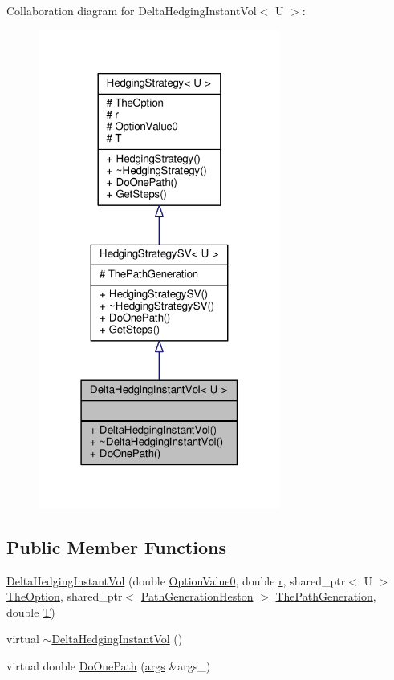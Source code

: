 Collaboration diagram for Delta\+Hedging\+Instant\+Vol$<$ U $>$\+:
\nopagebreak
\begin{figure}[H]
\begin{center}
\leavevmode
\includegraphics[width=226pt]{classDeltaHedgingInstantVol__coll__graph}
\end{center}
\end{figure}
\subsection*{Public Member Functions}
\begin{DoxyCompactItemize}
\item 
\hyperlink{classDeltaHedgingInstantVol_a64229bc4a65fa32959d22bc449ad0520}{Delta\+Hedging\+Instant\+Vol} (double \hyperlink{classHedgingStrategy_ac96528e9f4e5a0d1e5aadcc2ebdcab55}{Option\+Value0}, double \hyperlink{classHedgingStrategy_a313da7bc1911dba2a166d2c7bed5f1d7}{r}, shared\+\_\+ptr$<$ U $>$ \hyperlink{classHedgingStrategy_a65699a183423af9d947bb939ae8e907d}{The\+Option}, shared\+\_\+ptr$<$ \hyperlink{classPathGenerationHeston}{Path\+Generation\+Heston} $>$ \hyperlink{classHedgingStrategySV_aa341650c5b2846606e59e3e6c6225aca}{The\+Path\+Generation}, double \hyperlink{classHedgingStrategy_aedb4069f0709b49482a72b9d9c906a5e}{T})
\item 
virtual \hyperlink{classDeltaHedgingInstantVol_a87a3e73ee61d8dc3d9d04120f9f323a3}{$\sim$\+Delta\+Hedging\+Instant\+Vol} ()
\item 
virtual double \hyperlink{classDeltaHedgingInstantVol_ac05386c300db720ed07d8465123a8f7a}{Do\+One\+Path} (\hyperlink{path__generation_8h_a75c13cde2074f502cc4348c70528572d}{args} \&args\+\_\+)
\end{DoxyCompactItemize}
